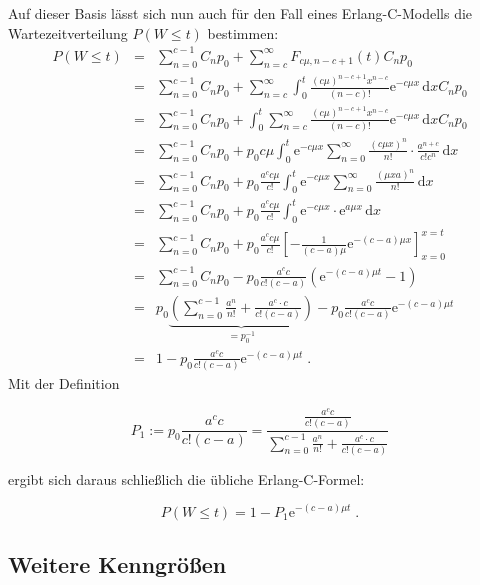 \documentclass[a4paper,11pt,oneside]{article}
\theoremstyle{definition}
\begin{document}
Auf dieser Basis lässt sich nun auch für den Fall eines Erlang-C-Modells die Wartezeitverteilung $P(W\le t)$ bestimmen:
{
\allowdisplaybreaks
\begin{eqnarray*}
P(W\le t)&=&
\sum_{n=0}^{c-1}C_np_0+\sum_{n=c}^\infty F_{c\mu,n-c+1}(t)C_np_0\\&=&
\sum_{n=0}^{c-1}C_np_0+\sum_{n=c}^\infty \int_0^t \frac{(c\mu)^{n-c+1}x^{n-c}}{(n-c)!}\mathrm{e}^{-c\mu x}\,\mbox{d}x C_np_0\\&=&
\sum_{n=0}^{c-1}C_np_0+\int_0^t\sum_{n=c}^\infty \frac{(c\mu)^{n-c+1}x^{n-c}}{(n-c)!}\mathrm{e}^{-c\mu x}\,\mbox{d}x C_np_0\\&=&
\sum_{n=0}^{c-1}C_np_0+p_0c\mu\int_0^t \mathrm{e}^{-c\mu x}\sum_{n=0}^\infty \frac{(c\mu x)^n}{n!}\cdot\frac{a^{n+c}}{c!c^n}\,\mbox{d}x\\&=&
\sum_{n=0}^{c-1}C_np_0+p_0\frac{a^cc\mu}{c!}\int_0^t \mathrm{e}^{-c\mu x}\sum_{n=0}^\infty \frac{(\mu xa)^n}{n!}\,\mbox{d}x\\&=&
\sum_{n=0}^{c-1}C_np_0+p_0\frac{a^cc\mu}{c!}\int_0^t \mathrm{e}^{-c\mu x}\cdot \mathrm{e}^{a\mu x}\,\mbox{d}x\\&=&
\sum_{n=0}^{c-1}C_np_0+p_0\frac{a^cc\mu}{c!}\left[-\frac{1}{(c-a)\mu}\mathrm{e}^{-(c-a)\mu x}\right]_{x=0}^{x=t}\\&=&
\sum_{n=0}^{c-1}C_np_0-p_0\frac{a^cc}{c!(c-a)}\left(\mathrm{e}^{-(c-a)\mu t}-1\right)\\&=&
p_0\underbrace{\left(\sum_{n=0}^{c-1}\frac{a^n}{n!}+\frac{a^c\cdot c}{c!(c-a)}\right)}_{=p_0^{-1}}-p_0\frac{a^cc}{c!(c-a)}\mathrm{e}^{-(c-a)\mu t}\\&=&
1-p_0\frac{a^cc}{c!(c-a)}\mathrm{e}^{-(c-a)\mu t}\;.
\end{eqnarray*}
}
Mit der Definition
\begin{tcolorbox}
\begin{equation}\label{MMcP1ErlangCBeweis}
P_1:=p_0\frac{a^cc}{c!(c-a)}=\frac{\frac{a^cc}{c!(c-a)}}{\sum_{n=0}^{c-1}\frac{a^n}{n!}+\frac{a^c\cdot c}{c!(c-a)}}
\end{equation}
\end{tcolorbox}
ergibt sich daraus schließlich die übliche Erlang-C-Formel:
\begin{tcolorbox}
$$
P(W\le t)=1-P_1\mathrm{e}^{-(c-a)\mu t}\;.
$$
\end{tcolorbox}

\subsection{Weitere Kenngrößen}
\end{document}
